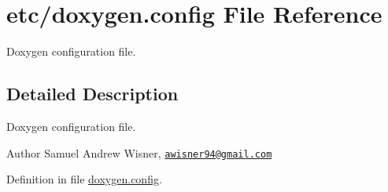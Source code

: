 \hypertarget{doxygen_8config}{\section{etc/doxygen.config File Reference}
\label{doxygen_8config}
}


Doxygen configuration file.  




\subsection{Detailed Description}
Doxygen configuration file. 

\begin{DoxyAuthor}{Author}
Samuel Andrew Wisner, \href{mailto:awisner94@gmail.com}{\tt awisner94@gmail.\+com} 
\end{DoxyAuthor}


Definition in file \hyperlink{doxygen_8config_source}{doxygen.\+config}.

